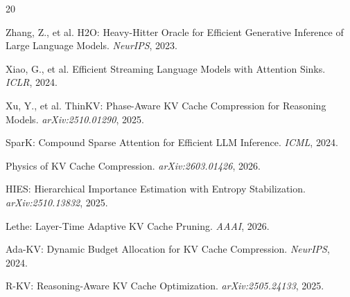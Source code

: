 \documentclass[11pt]{article}
\begin{document}

\begin{thebibliography}{20}

Zhang, Z., et al.
\newblock H2O: Heavy-Hitter Oracle for Efficient Generative Inference of Large Language Models.
\newblock \emph{NeurIPS}, 2023.

Xiao, G., et al.
\newblock Efficient Streaming Language Models with Attention Sinks.
\newblock \emph{ICLR}, 2024.

Xu, Y., et al.
\newblock ThinKV: Phase-Aware KV Cache Compression for Reasoning Models.
\newblock \emph{arXiv:2510.01290}, 2025.

SparK: Compound Sparse Attention for Efficient LLM Inference.
\newblock \emph{ICML}, 2024.

Physics of KV Cache Compression.
\newblock \emph{arXiv:2603.01426}, 2026.

HIES: Hierarchical Importance Estimation with Entropy Stabilization.
\newblock \emph{arXiv:2510.13832}, 2025.

Lethe: Layer-Time Adaptive KV Cache Pruning.
\newblock \emph{AAAI}, 2026.

Ada-KV: Dynamic Budget Allocation for KV Cache Compression.
\newblock \emph{NeurIPS}, 2024.

R-KV: Reasoning-Aware KV Cache Optimization.
\newblock \emph{arXiv:2505.24133}, 2025.

\end{thebibliography}
\end{document}
